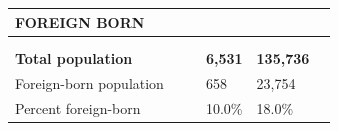 \documentclass[9pt]{report}
\begin{document}
\newpage
\setlength{\tabcolsep}{.01in} %
\begin{tabular}{p{.10in}p{.10in}p{.10in}p{3.7in}>{\hfill}p{.85in}>{\hfill}p{.85in}>{\hfill}p{.85in}>{\hfill}p{.85in}p{0.1in}}
\multicolumn{9}{l}{\parbox{7.1in}{\raggedright{\large{\strut\textbf{FOREIGN BORN}\strut}}}} \\ 
\hline
\multicolumn{4}{l}{\parbox{3.5in}{\raggedright{\textbf{}}}} & \multicolumn{1}{r}{\parbox{.85in}{\strut\raggedleft{\textbf{}\strut}}} & \multicolumn{1}{r}{\parbox{.85in}{\strut\raggedleft{\textbf{}\strut}}} & \multicolumn{1}{r}{\parbox{.85in}{\strut{}}} & \multicolumn{1}{r}{\parbox{.85in}{\strut{}}} & \\ 
\multicolumn{9}{l}{} \\ 
\multicolumn{4}{l}{\parbox{3.5in}{\strut\raggedright{\textbf{Total population}\strut}}} & \textbf{} & \textbf{} & \textbf{6,531} & \textbf{135,736} & \textbf{} \\ 
\multicolumn{4}{l}{\parbox{3.6in}{\strut\raggedright{{Foreign-born population}}\strut}} &  &  & 658 & 23,754 & \multicolumn{1}{l}{}  \\ 
\multicolumn{4}{l}{\parbox{3.6in}{\strut\raggedright{{Percent foreign-born}}\strut}} &  &  & 10.0\% & 18.0\% & \multicolumn{1}{l}{}  \\ 

\end{tabular}
\setlength{\tabcolsep}{6pt} %
\end{document}
